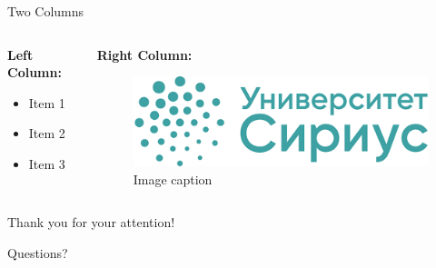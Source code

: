 \documentclass[10pt]{beamer}  %
\begin{document}
\begin{frame}{Two Columns}
    \begin{columns}
        \begin{column}{0.48\textwidth}
            \textbf{Left Column:}
            \begin{itemize}
                \item Item 1
                \item Item 2
                \item Item 3
            \end{itemize}
        \end{column}
        \begin{column}{0.48\textwidth}
            \textbf{Right Column:}
            \begin{figure}
                \centering
                \includegraphics[width=\linewidth]{images/Sirius-logo.png}
                \caption{Image caption}
            \end{figure}
        \end{column}
    \end{columns}
\end{frame}

\begin{frame}
    \centering
    \LARGE Thank you for your attention!
    
    \vspace{1em}
    
    \large Questions?
\end{frame}
\end{document}
